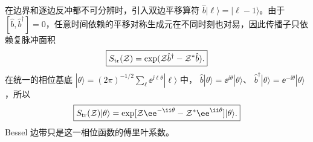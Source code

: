 在边界和逐边反冲都不可分辨时，引入双边平移算符 $\hat b|\ell\rangle=|\ell-1\rangle$。由于 $[\hat b,\hat b^\dagger]=0$，任意时间依赖的平移对称生成元在不同时刻也对易，因此传播子只依赖复脉冲面积
\begin{equation}
\boxed{
S_{\rm tr}(\mathcal Z)
=\exp(\mathcal Z \hat b^\dagger-\mathcal Z^*\hat b).}
\label{eq:universal_translation_propagator}
\end{equation}
在统一的相位基底
$|\theta\rangle=(2\pi)^{-1/2}\sum_\ell \ee^{\ii\ell\theta}|\ell\rangle$
中，
$\hat b|\theta\rangle=\ee^{\ii\theta}|\theta\rangle$、
$\hat b^\dagger|\theta\rangle=\ee^{-\ii\theta}|\theta\rangle$，所以
\begin{equation}
\boxed{
S_{\rm tr}(\mathcal Z)|\theta\rangle
=\exp[\mathcal Z \ee^{-\ii\theta}-\mathcal Z^*\ee^{\ii\theta}]|\theta\rangle.}
\label{eq:universal_translation_phase_solution}
\end{equation}
Bessel 边带只是这一相位函数的傅里叶系数。

